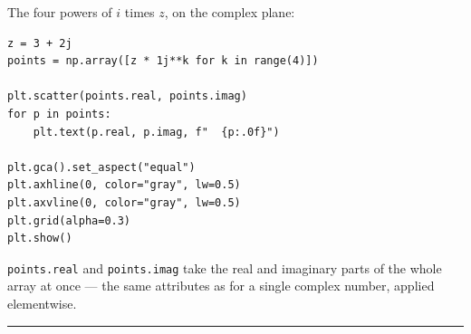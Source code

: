 \documentclass[11pt]{article}
\theoremstyle{definition}
\begin{document}
\noindent The four powers of $i$ times $z$, on the complex plane:

\begin{lstlisting}
z = 3 + 2j
points = np.array([z * 1j**k for k in range(4)])

plt.scatter(points.real, points.imag)
for p in points:
    plt.text(p.real, p.imag, f"  {p:.0f}")

plt.gca().set_aspect("equal")
plt.axhline(0, color="gray", lw=0.5)
plt.axvline(0, color="gray", lw=0.5)
plt.grid(alpha=0.3)
plt.show()
\end{lstlisting}

\noindent \texttt{points.real} and \texttt{points.imag} take the real and
imaginary parts of the whole array at once --- the same attributes as for a
single complex number, applied elementwise.

\bigskip
\noindent\rule{\textwidth}{0.4pt}

\smallskip
{}
\end{document}
